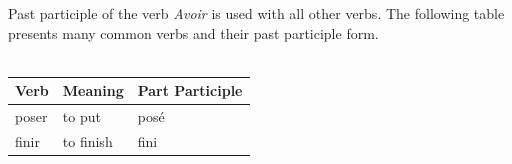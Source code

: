 \noindent Past participle of the verb \emph{Avoir} is used with all other verbs.
The following table presents many common verbs and their past participle form.\\\\

\begin{longtable}{| l | l | l |}
\hline
Verb            & Meaning             & Part Participle \\
\hline
\endhead
poser         & to put      &  pos\'e  \\ \hline
finir         & to finish   &  fini    \\ \hline
\end{longtable}


